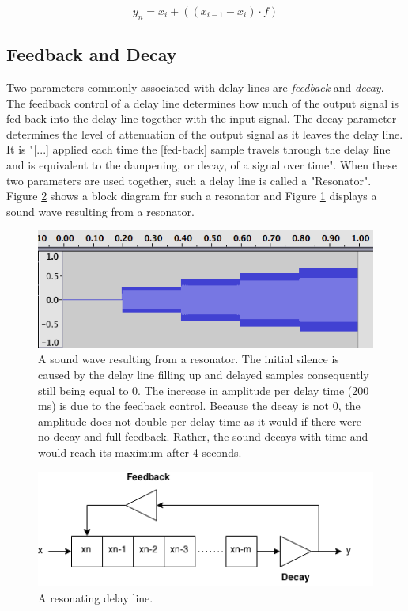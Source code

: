 \documentclass[12pt,twoside]{report}
\begin{document}
\begin{equation}
  y_{n} = x_{i} + ((x_{i-1} - x_{i}) \cdot f)
  \label{eq:interpolatedelay}
\end{equation}

\subsection{Feedback and Decay}

Two parameters commonly associated with delay lines are \emph{feedback} and \emph{decay}. The feedback control of a delay line determines how much of the output signal is fed back into the delay line together with the input signal. The decay parameter determines the level of attenuation of the output signal as it leaves the delay line. It is "[...] applied each time the [fed-back] sample travels through the delay line and is equivalent to the dampening, or decay, of a signal over time". When these two parameters are used together, such a delay line is called a "Resonator". Figure \ref{fig:resonator} shows a block diagram for such a resonator and Figure \ref{fig:resonatorwav} displays a sound wave resulting from a resonator. 

\begin{figure}
  \includegraphics[scale=0.6]{img/resonatorwav}
  \caption{A sound wave resulting from a resonator. The initial silence is caused by the delay line filling up and delayed samples consequently still being equal to 0. The increase in amplitude per delay time (200 ms) is due to the feedback control. Because the decay is not 0, the amplitude does not double per delay time as it would if there were no decay and full feedback. Rather, the sound decays with time and would reach its maximum after 4 seconds.}
  \label{fig:resonatorwav}
\end{figure}

\begin{figure}
  \includegraphics[scale=0.7]{img/resonator}
  \caption{A resonating delay line.}
  \label{fig:resonator}
\end{figure}
\end{document}
